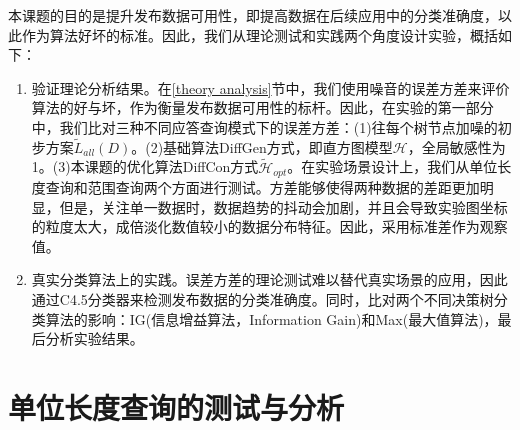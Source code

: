 本课题的目的是提升发布数据可用性，即提高数据在后续应用中的分类准确度，以此作为算法好坏的标准。因此，我们从理论测试和实践两个角度设计实验，概括如下：
\begin{enumerate}
	\item 验证理论分析结果。在\ref{theory analysis}节中，我们使用噪音的误差方差来评价算法的好与坏，作为衡量发布数据可用性的标杆。因此，在实验的第一部分中，我们比对三种不同应答查询模式下的误差方差：(1)往每个树节点加噪的初步方案$\tilde{L}_{all}(D)$。(2)基础算法DiffGen方式，即直方图模型$\mathcal{H}$，全局敏感性为1。(3)本课题的优化算法DiffCon方式$\tilde{\mathcal{H}}_{opt}$。在实验场景设计上，我们从单位长度查询和范围查询两个方面进行测试。方差能够使得两种数据的差距更加明显，但是，关注单一数据时，数据趋势的抖动会加剧，并且会导致实验图坐标的粒度太大，成倍淡化数值较小的数据分布特征。因此，采用标准差作为观察值。
	\item 真实分类算法上的实践。误差方差的理论测试难以替代真实场景的应用，因此通过C4.5分类器\cite{C45}来检测发布数据的分类准确度。同时，比对两个不同决策树分类算法的影响：IG(信息增益算法，Information Gain)和Max\cite{max}(最大值算法)，最后分析实验结果。
\end{enumerate}	

\section{单位长度查询的测试与分析} 
